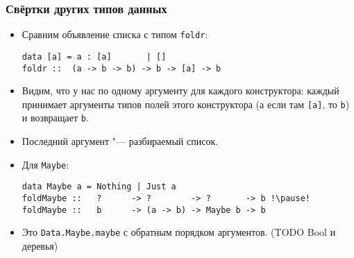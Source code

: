 \documentclass[11pt]{beamer}
\begin{document}
\begin{frame}[fragile]
  \frametitle{Свёртки других типов данных}
  \begin{itemize}
    \item Сравним объявление списка с типом \lstinline|foldr|:
          \begin{lstlisting}
data [a] = a : [a]       | []
foldr ::  (a -> b -> b) -> b -> [a] -> b
\end{lstlisting}
    \item Видим, что у нас по одному аргументу для каждого конструктора: каждый принимает аргументы типов полей этого конструктора (а если там \lstinline|[a]|, то \lstinline|b|) и возвращает \lstinline|b|.
    \item Последний аргумент "--- разбираемый список.
    \item Для \lstinline|Maybe|:
          \begin{lstlisting}[basicstyle=\ttfamily\footnotesize]
data Maybe a = Nothing | Just a
foldMaybe ::   ?      -> ?        -> ?       -> b !\pause!
foldMaybe ::   b      -> (a -> b) -> Maybe b -> b
\end{lstlisting}
          \pause
    \item Это \lstinline|Data.Maybe.maybe| с обратным порядком аргументов. (TODO Bool и деревья)
  \end{itemize}
\end{frame}
\end{document}
